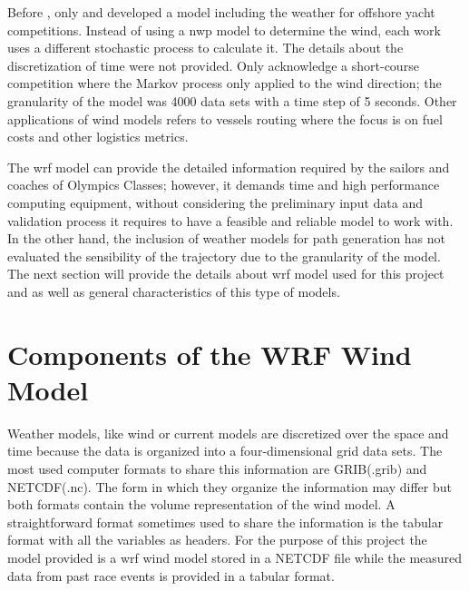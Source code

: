 Before \cite{giannaros2018ultrahigh}, only \cite{philpott2001optimising} and \cite{allsopp2000optimal} developed a model including the weather for offshore yacht competitions. Instead of using a \acrshort{nwp} model to determine the wind, each work uses a different stochastic process to calculate it. The details about the discretization of time were not provided. Only \cite{philpott2001optimising} acknowledge a short-course competition where the Markov process only applied to the wind direction; the granularity of the model was 4000 data sets with a time step of 5 seconds. %
Other applications of wind models refers to vessels routing where the focus is on fuel costs and other logistics metrics. \par 
The \acrshort{wrf} model can provide the detailed information required by the sailors and coaches of Olympics Classes; however, it demands time and high performance computing equipment, without considering the preliminary input data and validation process it requires to have a feasible and reliable model to work with. In the other hand, the inclusion of weather models for path generation has not evaluated the sensibility of the trajectory due to the granularity of the model. The next section will provide the details about \acrshort{wrf} model used for this project and as well as general characteristics of this type of models. \par %



\section{Components of the WRF Wind Model}
Weather models, like wind or current models are discretized over the space and time because the data is organized into a four-dimensional grid data sets. The most used computer formats to share this information are GRIB(.grib) and NETCDF(.nc). The form in which they organize the information may differ but both formats contain the volume representation of the wind model. A straightforward format sometimes used to share the information is the tabular format with all the variables as headers. For the purpose of this project the model provided is a \acrshort{wrf} wind model stored in a NETCDF file while the measured data from past race events is provided in a tabular format. \par

